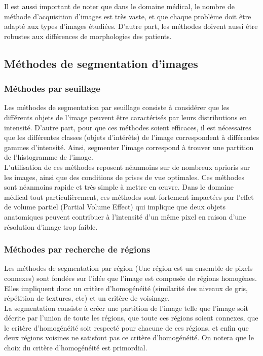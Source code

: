 Il est aussi important de noter que dans le domaine médical, le nombre de méthode d'acquisition d'images est très vaste, et que chaque problème doit être adapté aux types d'images étudiées. D'autre part, les méthodes doivent aussi être robustes aux différences de morphologies des patients.


\subsection{Méthodes de segmentation d'images}
\subsubsection*{Méthodes par seuillage}
Les méthodes de segmentation par seuillage consiste à considérer que les différents objets de l'image peuvent être caractérisés par leurs distributions en intensité. D'autre part, pour que ces méthodes soient efficaces, il est nécessaires que les différentes classes (objets d'intérêts) de l'image correspondent à différentes gammes d'intensité. Ainsi, segmenter l'image correspond à trouver une partition de l'histogramme de l'image.\\

L'utilisation de ces méthodes reposent néanmoins sur de nombreux aprioris sur les images, ainsi que des conditions de prises de vue optimales. Ces méthodes sont néanmoins rapide et très simple à mettre en œuvre. Dans le domaine médical tout particulièrement, ces méthodes sont fortement impactées par l'effet de volume partiel (Partial Volume Effect) qui implique que deux objets anatomiques peuvent contribuer à l'intensité d'un même pixel en raison d'une résolution d'image trop faible.

\subsubsection*{Méthodes par recherche de régions}
Les méthodes de segmentation par région (Une région est un ensemble de pixels connexes) sont fondées sur l'idée que l'image est composée de régions homogènes. Elles impliquent donc un critère d'homogénéité (similarité des niveaux de gris, répétition de textures, etc) et un critère de voisinage.\\

La segmentation consiste à créer une partition de l'image telle que l'image soit décrite par l'union de toute les régions, que toute ces régions soient connexes, que le critère d'homogénéité soit respecté pour chacune de ces régions, et enfin que deux régions voisines ne satisfont pas ce critère d'homogénéité. On notera que le choix du critère d'homogénéité est primordial.



